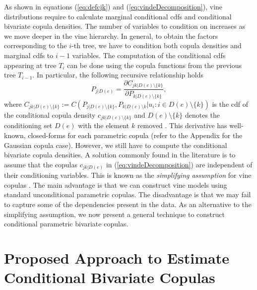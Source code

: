 \documentclass{article}
\begin{document}
As shown in equations (\ref{eq:defcjk}) and (\ref{eq:vindeDecomposition}), vine
distributions require to calculate marginal conditional cdfs and conditional
bivariate copula densities.  The number of variables to 
condition on increases as we move deeper in the vine hierarchy. In general, to
obtain the factors corresponding to the $i$-th tree, we have to condition both
copula densities and marginal cdfs to $i-1$ variables. The computation of the
conditional cdfs appearing at tree $T_{i}$ can be done using the copula
functions from the previous tree $T_{i-1}$.  In particular, the
following recursive relationship holds
\begin{equation}
  P_{j|D(e)} = \frac{\partial C_{{jk}|D(e)\setminus \{k\}}}{\partial
  P_{k|D(e)\setminus \{k\}}},\label{eq:h_function}
\end{equation}
where $C_{{jk}|D(e)\setminus \{k\}}:=C(P_{j|D(e)\setminus
\{k\}},P_{k|D(e)\setminus k}|u_i: i \in D(e)\setminus \{k\})$ is the cdf of the
conditional copula density $c_{{jk}|D(e)\setminus \{k\}}$ and $D(e)\setminus
\{k\}$ denotes the conditioning set $D(e)$ with the element $k$ removed
\cite{Joe1996}. This derivative has well-known, closed-forms for each
parametric copula (refer to the Appendix for the Gaussian copula case).
However, we still have to compute the conditional bivariate copula densities.
A solution commonly found in the literature is to assume that the copulas
$c_{jk|D(e)}$ in (\ref{eq:vindeDecomposition}) are independent of their
conditioning variables. This is known as the \emph{simplifying assumption} for
vine copulas \cite{Hobaek2010}.  The main advantage is that we can construct
vine models using standard unconditional parametric copulas.  The disadvantage
is that we may fail to capture some of the dependencies present in the data.
As an alternative to the simplifying assumption, we now present a general
technique to construct conditional parametric bivariate copulas.

\section{Proposed Approach to Estimate Conditional Bivariate Copulas}\label{sec:ccop}
\end{document}
